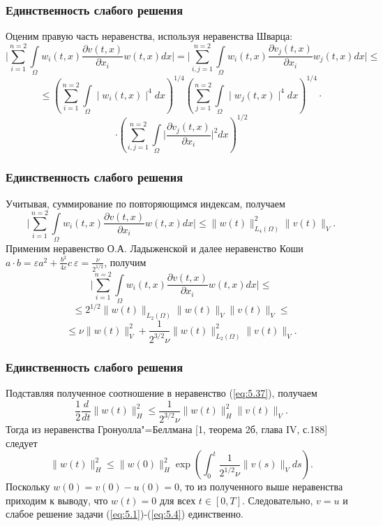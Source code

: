 \documentclass[10pt, pdf, hyperref={unicode}]{beamer}
\begin{document}
    \begin{frame}
    \frametitle{Единственность слабого решения}
    \begin{center}
      \begin{minipage}[h]{0.97\linewidth}
      Оценим правую часть неравенства, используя неравенства Шварца:
      $$\bigg|\sum_{i=1}^{n=2}\int\limits_\Omega w_i(t, x)\frac{\partial v(t, x)}{\partial x_i}w(t, x)dx\bigg|=
      \bigg|\sum_{i,j=1}^{n=2}\int\limits_\Omega w_i(t, x)\frac{\partial v_j(t, x)}{\partial x_i}w_j(t, x)dx\bigg|\le$$
      $$\le\left(\sum_{i=1}^{n=2}\int\limits_\Omega \mid w_i(t, x)\mid^4dx\right)^{1/4}\left(\sum_{j=1}^{n=2}\int\limits_\Omega \mid w_j(t, x)\mid^4dx\right)^{1/4}\cdot$$
      $$\cdot\left(\sum_{i,j=1}^{n=2}\int\limits_\Omega\bigg|\frac{\partial v_j(t, x)}{\partial x_i} \bigg|^2dx \right)^{1/2}$$
      \end{minipage}
    \end{center}
  \end{frame}

  \begin{frame}
    \frametitle{Единственность слабого решения}
    \begin{center}
      \begin{minipage}[h]{0.97\linewidth}
      Учитывая, суммирование по повторяющимся индексам, получаем
      $$\bigg|\sum_{i=1}^{n=2}\int\limits_\Omega w_i(t, x)\frac{\partial v(t, x)}{\partial x_i}w(t, x)dx\bigg|\le\| w(t)\|_{L_4(\Omega)}^2\| v(t)\|_V.$$
      Применим неравенство О.А. Ладыженской и далее неравенство Коши \linebreak
      $a\cdot b=\varepsilon a^2+\frac{b^2}{4\varepsilon}c \ \varepsilon=\frac{\nu}{2^{1/2}}$, получим
      $$\bigg|\sum_{i=1}^{n=2}\int\limits_\Omega w_i(t, x)\frac{\partial v(t, x)}{\partial x_i}w(t, x)dx\bigg|\le$$
      $$\le 2^{1/2}\| w(t)\|_{L_2(\Omega)}\| w(t)\|_V\| v(t)\|_V\le$$
      $$\le \nu\| w(t)\|_V^2+\frac{1}{2^{3/2}\nu}\| w(t)\|_{L_2(\Omega)}^2\| v(t)\|_V.$$
      \end{minipage}
    \end{center}
  \end{frame}

  \begin{frame}
    \frametitle{Единственность слабого решения}
    \begin{center}
      \begin{minipage}[h]{0.97\linewidth}
      Подставляя полученное соотношение в неравенство (\ref{eq:5.37}), получаем
      $$\frac{1}{2}\frac{d}{dt}\| w(t)\|_H^2\le\frac{1}{2^{3/2}\nu}\| w(t)\|_H^2\| v(t)\|_V.$$
      Тогда из неравенства Гронуолла"=Беллмана [1, теорема 2б, глава IV, с.188] следует
      $$\| w(t)\|_H^2\le\| w(0)\|_H^2\exp\left(\int_0^t\frac{1}{2^{1/2}\nu}\| v(s)\|_Vds\right).$$
      Поскольку $w(0) = v(0)- u(0) = 0$, то из полученного выше неравенства приходим к выводу,
      что $w(t)=0$ для всех $t\in[0, T]$. Следовательно, $v=u$ и слабое решение задачи (\ref{eq:5.1})-(\ref{eq:5.4}) единственно.
      \end{minipage}
    \end{center}
  \end{frame}
\end{document}

